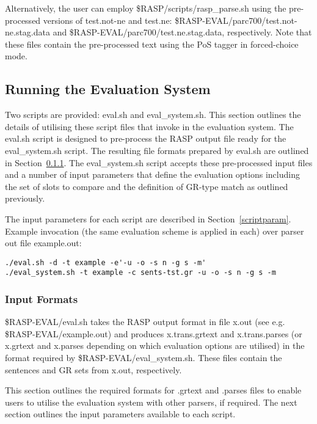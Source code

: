 \documentclass[10pt]{article}
\begin{document}
Alternatively, the user can employ  \$RASP/scripts/rasp\_parse.sh
using the pre-processed versions of test.not-ne and test.ne:
\$RASP-EVAL/parc700/test.not-ne.stag.data and 
\$RASP-EVAL/parc700/test.ne.stag.data, respectively. 
Note that these files contain the pre-processed text using the PoS
tagger in forced-choice mode.

\subsection{Running the Evaluation System}

Two scripts are provided: eval.sh and eval\_system.sh. 
This section outlines the details of utilising these
script files that invoke in the evaluation system.
The eval.sh script is designed to pre-process the 
RASP output file ready for the eval\_system.sh script.
The resulting file formats prepared by eval.sh are
outlined in Section~\ref{inputformats}. 
The eval\_system.sh script accepts these pre-processed
input files and a number of input parameters that
define the evaluation options including the set
of slots to compare and the definition of GR-type
match as outlined previously.

The input parameters for each script are described in
Section~\ref{scriptparam}. 
Example invocation (the same evaluation scheme is applied in each) 
over parser out file example.out:
\begin{verbatim}
./eval.sh -d -t example -e'-u -o -s n -g s -m'
./eval_system.sh -t example -c sents-tst.gr -u -o -s n -g s -m
\end{verbatim}

\subsubsection{Input Formats}
\label{inputformats}

\$RASP-EVAL/eval.sh takes the RASP output format in file x.out (see e.g.
\$RASP-EVAL/example.out) and produces x.trans.grtext and
x.trans.parses (or x.grtext and x.parses depending on which
evaluation options are utilised)
in the format required by \$RASP-EVAL/eval\_system.sh. These files
contain the sentences and GR sets from x.out, respectively.

This section outlines the required formats for .grtext and
.parses files to enable users to utilise the evaluation
system with other parsers, if required. The next section outlines the
input parameters available to each script.
\end{document}
